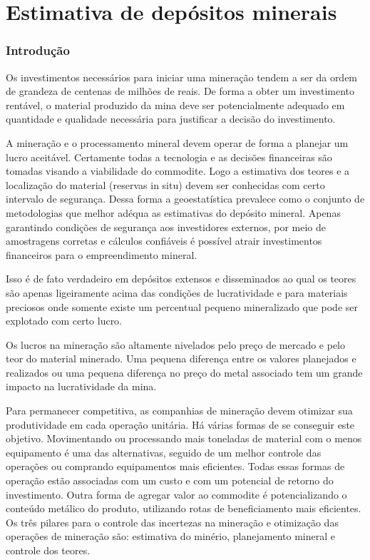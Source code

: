 
\chapter{Estimativa de depósitos minerais}

\subsection{Introdução}

Os investimentos necessários para iniciar uma mineração tendem a ser da ordem de grandeza de centenas de milhões de reais. De forma a obter um investimento rentável, o material produzido da mina deve ser potencialmente adequado em quantidade e qualidade necessária para justificar a decisão do investimento.

 A mineração e o processamento mineral devem operar de forma a planejar um lucro aceitável. Certamente todas a tecnologia e as decisões financeiras são tomadas visando a viabilidade do commodite. Logo a estimativa dos teores e a localização do material (reservas in situ) devem ser conhecidas com certo intervalo de segurança. Dessa forma a geoestatística prevalece como o conjunto de metodologias que melhor adéqua as estimativas do depósito mineral.  Apenas garantindo condições de segurança aos investidores externos, por meio de amostragens corretas e cálculos confiáveis é possível atrair investimentos financeiros para o empreendimento mineral. 
 
Isso é de fato verdadeiro em depósitos extensos e disseminados ao qual os teores são apenas ligeiramente acima das condições de lucratividade e para materiais preciosos onde somente existe um percentual pequeno mineralizado que pode ser explotado com certo lucro. 
 
 Os lucros na mineração são altamente nivelados pelo preço de mercado e pelo teor do material minerado. Uma pequena diferença entre os valores planejados e realizados ou uma pequena diferença no preço do metal associado tem um grande impacto na lucratividade da mina. 
 
 Para permanecer competitiva, as companhias de mineração devem otimizar sua produtividade em cada operação unitária. Há várias formas de se conseguir este objetivo. Movimentando ou processando mais toneladas de material com o menos equipamento é uma das alternativas, seguido de um melhor controle das operações ou comprando equipamentos mais eficientes. Todas essas formas de operação estão associadas com um custo e  com um potencial de retorno do investimento. Outra forma de agregar valor ao commodite é potencializando o conteúdo metálico do produto, utilizando rotas de beneficiamento mais eficientes. 
 Os três pilares para o controle das incertezas na mineração e otimização das operações de mineração são: estimativa do minério, planejamento mineral e controle dos teores.
 
